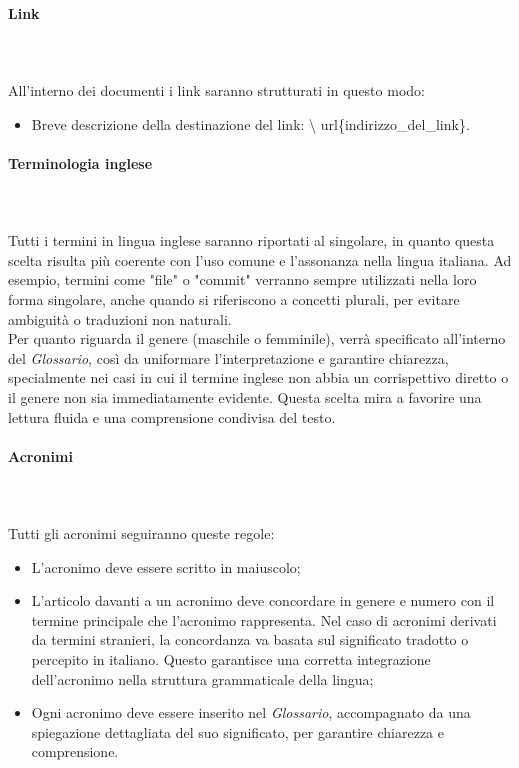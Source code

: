 \paragraph{Link}
~\\\\All'interno dei documenti i link saranno strutturati in questo modo:
\begin{itemize}
      \item Breve descrizione della destinazione del link: \textbackslash
            url\{indirizzo\_del\_link\}.
\end{itemize}
\paragraph{Terminologia inglese}
~\\\\Tutti i termini in lingua inglese saranno riportati al singolare, in quanto
questa scelta risulta più coerente con l'uso comune e l'assonanza nella lingua
italiana. Ad esempio, termini come "file" o "commit" verranno sempre utilizzati
nella loro forma singolare, anche quando si riferiscono a concetti plurali, per
evitare ambiguità o traduzioni non naturali.\\ Per quanto riguarda il genere
(maschile o femminile), verrà specificato all'interno del \textit{Glossario},
così da uniformare l'interpretazione e garantire chiarezza, specialmente nei
casi in cui il termine inglese non abbia un corrispettivo diretto o il genere
non sia immediatamente evidente. Questa scelta mira a favorire una lettura
fluida e una comprensione condivisa del testo.
\paragraph{Acronimi}
~\\\\Tutti gli acronimi seguiranno queste regole:
\begin{itemize}
      \item L'acronimo deve essere scritto in maiuscolo;
      \item L'articolo davanti a un acronimo deve concordare in genere e numero con il
            termine principale che l'acronimo rappresenta. Nel caso di acronimi derivati da
            termini stranieri, la concordanza va basata sul significato tradotto o
            percepito in italiano. Questo garantisce una corretta integrazione
            dell'acronimo nella struttura grammaticale della lingua;
      \item Ogni acronimo deve essere inserito nel \textit{Glossario}, accompagnato da una
            spiegazione dettagliata del suo significato, per garantire chiarezza e
            comprensione.
\end{itemize}
